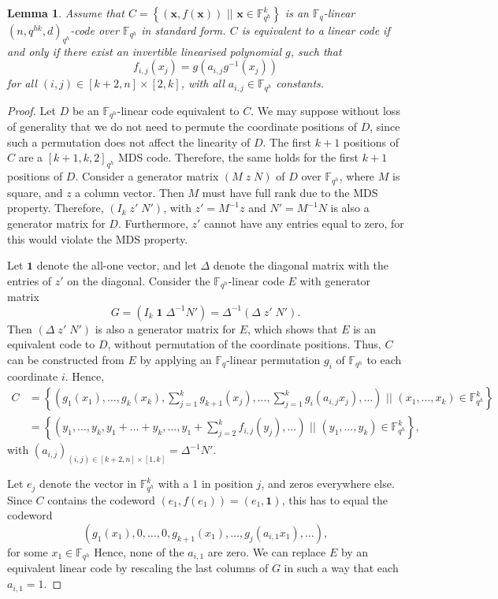 \documentclass[a4paper]{article}
\newtheorem{lm}[thm]{Lemma}
\theoremstyle{definition}
\newcommand{\FF}{\mathbb F}
\newcommand{\sett}[2]{ \left\{ #1 \, \, || \, \, #2 \right \} }
\newcommand{\one}{\mathbf 1}
\newcommand{\xx}{\mathbf x}
\begin{document}
\begin{lm}
 \label{LmEqLin}
 Assume that $C=\sett{(\xx,f(\xx))}{\xx \in \FF_{q^h}^k}$ is an $\FF_q$-linear $(n,q^{hk},d)_{q^h}$-code over $\FF_{q^h}$ in standard form.
 $C$ is equivalent to a linear code if and only if there exist an invertible linearised polynomial $g$, such that
 \[
  f_{i,j}(x_j) = g(a_{i,j} g^{-1}(x_j))
 \]
 for all $(i,j) \in [k+2,n] \times [2,k]$, with all $a_{i,j} \in \FF_{q^h}$ constants.
\end{lm}

\begin{proof}
Let $D$ be an $\FF_{q^h}$-linear code equivalent to $C$.
We may suppose without loss of generality that we do not need to permute the coordinate positions of $D$, since such a permutation does not affect the linearity of $D$.
The first $k+1$ positions of $C$ are a $[k+1,k,2]_{q^h}$ MDS code.
Therefore, the same holds for the first $k+1$ positions of $D$.
Consider a generator matrix $(M \; z \; N )$ of $D$ over $\FF_{q^h}$, where $M$ is square, and $z$ a column vector.
Then $M$ must have full rank due to the MDS property.
Therefore, $(I_k \; z' \; N')$, with $z'=M^{-1} z$ and $N' = M^{-1} N$ is also a generator matrix for $D$.
Furthermore, $z'$ cannot have any entries equal to zero, for this would violate the MDS property.

Let $\one$ denote the all-one vector, and let $\Delta$ denote the diagonal matrix with the entries of $z'$ on the diagonal.
Consider the $\FF_{q^h}$-linear code $E$ with generator matrix
\[
 G = (I_k \; \one \; \Delta^{-1} N') = \Delta^{-1} (\Delta \; z' \; N').
\]
Then $(\Delta \; z' \; N')$ is also a generator matrix for $E$, which shows that $E$ is an equivalent code to $D$, without permutation of the coordinate positions.
Thus, $C$ can be constructed from $E$ by applying an $\FF_q$-linear permutation $g_i$ of $\FF_{q^h}$ to each coordinate $i$.
Hence,
\begin{align}
 \label{EqCx}
 C &= \sett{\left(g_1(x_1), \dots, g_k(x_k), \sum_{j=1}^k g_{k+1}(x_j), ..., \sum_{j=1}^k g_i (a_{i,j} x_j), \dots \right)}{(x_1,\dots,x_k) \in \FF_{q^h}^k} \\
 &= \sett{\left(y_1, \dots, y_k, y_1 + \dots + y_k, \dots, y_1 + \sum_{j=2}^k f_{i,j}(y_j), \dots \right)}{(y_1, \dots, y_k) \in \FF_{q^h}^k},
\end{align}
with $(a_{i,j})_{(i,j) \in [k+2,n]\times[1,k]} = \Delta^{-1} N'$.

Let $e_j$ denote the vector in $\FF_{q^h}^k$ with a 1 in position $j$, and zeros everywhere else.
Since $C$ contains the codeword $(e_1, f(e_1)) = (e_1, \one)$, this has to equal the codeword
\[
 (g_1(x_1),0,\dots,0,g_{k+1}(x_1), \dots, g_j(a_{i,1}x_1), \dots),
\]
for some $x_1 \in \FF_{q^h}$
Hence, none of the $a_{i,1}$ are zero.
We can replace $E$ by an equivalent linear code by rescaling the last columns of $G$ in such a way that each $a_{i,1} = 1$.


\end{proof}
\end{document}
